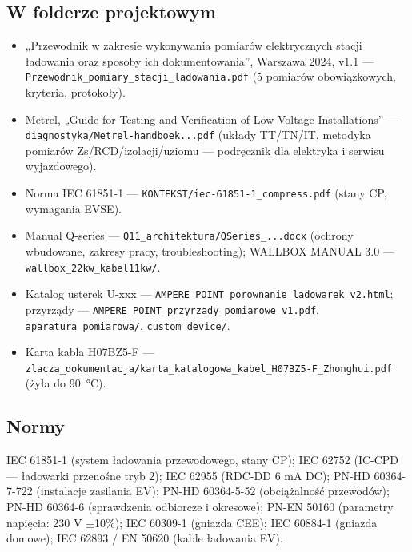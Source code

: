 \documentclass[11pt]{article}
\begin{document}
\subsection{W folderze projektowym}
\begin{itemize}
\item „Przewodnik w zakresie wykonywania pomiarów elektrycznych stacji ładowania oraz sposoby ich dokumentowania'', Warszawa 2024, v1.1 — \texttt{Przewodnik\_\allowbreak pomiary\_\allowbreak stacji\_\allowbreak ladowania.pdf} (5 pomiarów obowiązkowych, kryteria, protokoły).
\item Metrel, „Guide for Testing and Verification of Low Voltage Installations'' — \texttt{diagnostyka/\allowbreak Metrel-handboek...pdf} (układy TT/TN/IT, metodyka pomiarów Zs/RCD/izolacji/uziomu — podręcznik dla elektryka i serwisu wyjazdowego).
\item Norma IEC 61851-1 — \texttt{KONTEKST/iec-61851-1\_\allowbreak compress.pdf} (stany CP, wymagania EVSE).
\item Manual Q-series — \texttt{Q11\_\allowbreak architektura/QSeries\_\allowbreak ...docx} (ochrony wbudowane, zakresy pracy, troubleshooting); WALLBOX MANUAL 3.0 — \texttt{wallbox\_\allowbreak 22kw\_\allowbreak kabel11kw/}.
\item Katalog usterek U-xxx — \texttt{AMPERE\_\allowbreak POINT\_\allowbreak porownanie\_\allowbreak ladowarek\_\allowbreak v2.html}; przyrządy — \texttt{AMPERE\_\allowbreak POINT\_\allowbreak przyrzady\_\allowbreak pomiarowe\_\allowbreak v1.pdf}, \texttt{aparatura\_\allowbreak pomiarowa/}, \texttt{custom\_\allowbreak device/}.
\item Karta kabla H07BZ5-F — \texttt{zlacza\_\allowbreak dokumentacja/karta\_\allowbreak katalogowa\_\allowbreak kabel\_\allowbreak H07BZ5-F\_\allowbreak Zhonghui.pdf} (żyła do 90~°C).
\end{itemize}
\subsection{Normy}
IEC 61851-1 (system ładowania przewodowego, stany CP); IEC 62752 (IC-CPD — ładowarki przenośne tryb 2); IEC 62955 (RDC-DD 6 mA DC); PN-HD 60364-7-722 (instalacje zasilania EV); PN-HD 60364-5-52 (obciążalność przewodów); PN-HD 60364-6 (sprawdzenia odbiorcze i okresowe); PN-EN 50160 (parametry napięcia: 230 V $\pm$10\%); IEC 60309-1 (gniazda CEE); IEC 60884-1 (gniazda domowe); IEC 62893 / EN 50620 (kable ładowania EV).
\end{document}
